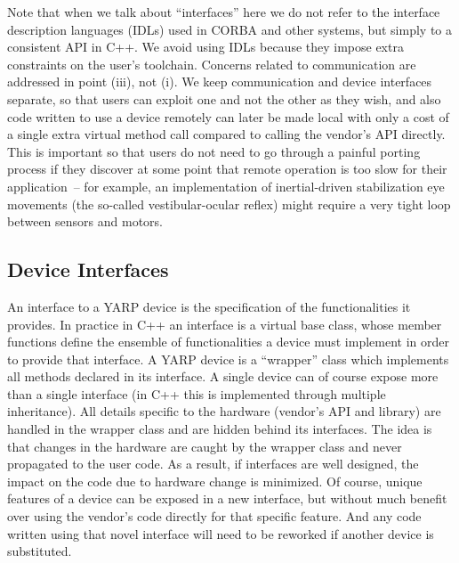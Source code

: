 Note that when we talk about ``interfaces'' here we do not refer to
the interface description languages (IDLs) used in CORBA and other systems,
but simply to a consistent API in C++.  
%
We avoid using IDLs because they impose extra constraints on the user's
toolchain.
%
Concerns related to
communication are addressed in point (iii), not (i).  We keep
communication and device interfaces separate, so that users can
exploit one and not the other as they wish, and also code written to
use a device remotely can later be made local with only a cost of a
single extra virtual method call compared to calling the vendor's API directly.
This is important so that users do not need to go through a painful
porting process if they discover at some point that remote operation
is too slow for their application~-- for example, an implementation
of inertial-driven stabilization eye movements (the so-called vestibular-ocular reflex)
might require a very tight loop between sensors and motors.



\subsection{Device Interfaces}
An interface to a YARP device is the specification of the functionalities
it provides. In practice in C++ an interface is a virtual base class, whose 
member functions define the ensemble of  functionalities a device must 
implement in order to provide that interface.  A YARP device is a 
``wrapper'' class which implements all methods declared in its interface. 
A single device can of course expose more than a single interface 
(in C++ this is implemented through multiple
inheritance). All details specific to the hardware 
(vendor's API and library) are handled in the wrapper class and are 
hidden behind its interfaces. 
The idea is that changes in the hardware are caught by the wrapper class 
and never propagated to the user code. As a result, if interfaces are 
well designed, the impact on the code due to hardware change is minimized. 
%
Of course, unique features of a device can be exposed in a new interface,
but without much benefit over using the vendor's code directly for that
specific feature.  And any code written using that novel interface will
need to be reworked if another device is substituted.

